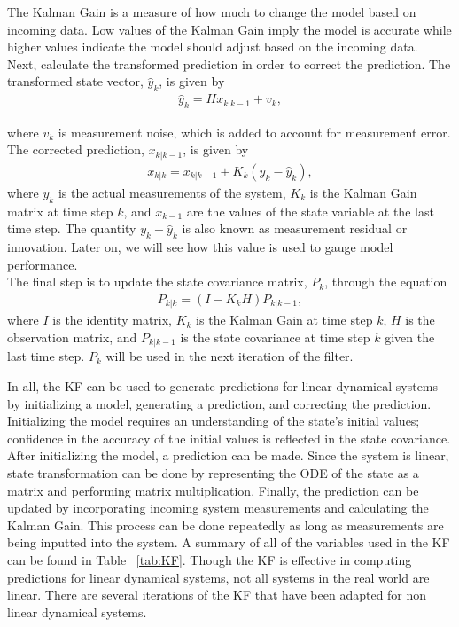 \begin{enumerate}
     \noindent The Kalman Gain is a measure of how much to change the model based on incoming data. Low values of the Kalman Gain imply the model is accurate while higher values indicate the model should adjust based on the incoming data.  \\ 
   
     Next, calculate the transformed prediction in order to correct the prediction. The transformed state vector, $\hat y_k$, is given by
    \begin{align*}
        \hat y_k = H x_{k|k-1} + v_k,
    \end{align*}
    
    where $v_k$ is measurement noise, which is added to account for measurement error.
    The corrected prediction, $ x_{k|k-1} $, is given by
    \begin{align*} 
        x_{k|k} = x_{k|k - 1} + K_k(y_k - \hat y_{k}),
    \end{align*}
   where  $y_k$ is the actual measurements of the system, $K_k$ is the Kalman Gain matrix at time step $k$, and $x_{k-1}$ are the values of the state variable at the last time step. The quantity $y_k - \hat y_{k}$ is also known as measurement residual or innovation.  Later on, we will see how this value is used to gauge model performance. \\
   
      The final step is to update the state covariance matrix, $P_k $, through the equation
    \begin{align*} 
        P_{k|k} = (I - K_k H) P_{k | k-1},
    \end{align*}
    where $I$ is the identity matrix, $K_k$ is the Kalman Gain at time step $k$, $H$ is the observation matrix, and $P_{k|k-1}$ is the state covariance at time step $k$ given the last time step. $ P_k $ will be used in the next iteration of the filter.
\end{enumerate} 
\newpage

\noindent In all, the KF can be used to generate predictions for linear dynamical systems by initializing a model, generating a prediction, and correcting the prediction. Initializing the model requires an understanding of the state's initial values; confidence in the accuracy of the initial values is reflected in the state covariance. After initializing the model, a prediction can be made. Since the system is linear, state transformation can be done by representing the ODE of the state as a matrix and performing matrix multiplication. Finally, the prediction can be updated by incorporating incoming system measurements and calculating the Kalman Gain. This process can be done repeatedly as long as measurements are being inputted into the system. A summary of all of the variables used in the KF can be found in Table ~\ref{tab:KF}. Though the KF is effective in computing predictions for linear dynamical systems, not all systems in the real world are linear. There are several iterations of the KF that have been adapted for non linear dynamical systems.

